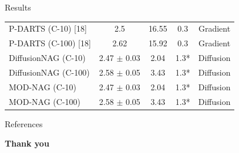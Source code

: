 \documentclass[aspectratio=169,xcolor=dvipsnames]{beamer}
\begin{document}
\begin{frame}{Results}
\begin{table}[h]
\begin{tabular}{lcccc}
            P-DARTS (C-10) {[}18{]}         & 2.5                     & 16.55                & 0.3                             & Gradient               \\
            P-DARTS (C-100) {[}18{]}        & 2.62                    & 15.92                & 0.3                             & Gradient               \\
            DiffusionNAG (C-10)             & 2.47 $\pm$ 0.03         & 2.04                 & 1.3*                            & Diffusion                     \\
            DiffusionNAG (C-100)            & 2.58 $\pm$ 0.05         & 3.43                 & 1.3*                            & Diffusion                     \\
            MOD-NAG (C-10)                  & 2.47 $\pm$ 0.03         & 2.04                 & 1.3*                            & Diffusion                     \\
            MOD-NAG (C-100)                 & 2.58 $\pm$ 0.05         & 3.43                 & 1.3*                            & Diffusion                     \\
        \end{tabular}
    \end{table}
    \nocite{2023arXiv230516943A}
    \nocite{DBLP:journals/corr/abs-1807-11626}
    \nocite{DBLP:journals/corr/abs-1812-00332}
\end{frame}

\begin{frame}{References}
    \printbibliography[heading=none]
\end{frame}


\begin{frame}
    \Huge{\centerline{\textbf{Thank you}}}
\end{frame}

\end{document}
